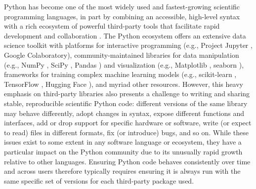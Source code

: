 \documentclass[preprint,12pt, a4paper]{elsarticle}
\begin{document}
Python \cite{vanR95} has become one of the most widely used and fastest-growing scientific programming languages, in part by combining an accessible, high-level syntax with a rich ecosystem of powerful third-party tools that facilitate rapid development and collaboration \cite{MullEtal15}.
The Python ecosystem offers an extensive data science toolkit with platforms for interactive programming (e.g., Project Jupyter \cite{KluyEtal16}, Google Colaboratory), community-maintained libraries for data manipulation (e.g., NumPy \cite{HarrEtal20}, SciPy \cite{VirtEtal20}, Pandas \cite{McKi10}) and visualization (e.g., Matplotlib \cite{Hunt07}, seaborn \cite{Wask21}), frameworks for training complex machine learning models (e.g., scikit-learn \cite{PedrEtal11}, TensorFlow \cite{AbadEtal15}, Hugging Face \cite{WolfEtal20}), and myriad other resources.
However, this heavy emphasis on third-party libraries also presents a challenge to writing and sharing stable, reproducible scientific Python code:
different versions of the same library may behave differently, adopt changes in syntax, expose different functions and interfaces, add or drop support for specific hardware or software, write (or expect to read) files in different formats, fix (or introduce) bugs, and so on.
While these issues exist to some extent in any software language or ecosystem, they have a particular impact on the Python community due to its unusually rapid growth relative to other languages.
Ensuring Python code behaves consistently over time and across users therefore typically requires ensuring it is always run with the same specific set of versions for each third-party package used.
\end{document}
